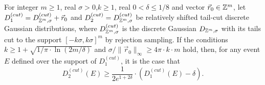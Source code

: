 \begin{lemma} \label{le:Renyi} For integer $m \geq 1$, real
  $\sigma>0$,$k \geq 1$, real $0<\delta \leq 1/8$ and vector
  $\vec{r}_0 \in \mathbb{Z}^m$, let
  $D_1^{(cut)} = D_{\mathbb{Z}^m,\sigma}^{(cut)} + \vec{r}_0$ and
  $D_2^{(cut)} = D_{\mathbb{Z}^m,\sigma}^{(cut)}$ be relatively shifted tail-cut
  discrete Gaussian distributions, where $D_{\mathbb{Z}^m,\sigma}^{(cut)}$ is the
  discrete Gaussian $D_{\mathbb{Z}^m,\sigma}$ with its tails cut to the support
  $[-k\sigma,k\sigma]^m$ by rejection sampling. If the conditions
  $k \geq 1 + \sqrt{1/\pi \cdot \ln(2m/\delta)}$ and
  $\sigma/\|\vec{r}_0\|_{\infty} \geq 4 \pi \cdot k \cdot m$ hold, then, for any
  event $E$ defined over the support of $D_1^{(cut)}$, it is the case that
$$
D_2^{(cut)}(E) \geq \frac{1}{2e^{1+2\delta}} \cdot \left(D_1^{(cut)}(E) - \delta\right).
$$
\end{lemma}


